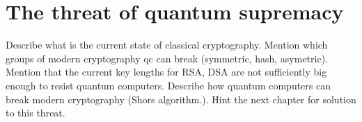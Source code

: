 \chapter{The threat of quantum supremacy}

Describe what is the current state of classical cryptography. Mention which groups of modern cryptography qc can break (symmetric, hash, asymetric). Mention that the current key lengths for RSA, DSA are not sufficiently big enough to resist quantum computers. Describe how quantum computers can break modern cryptography (Shors algorithm.). Hint the next chapter for solution to this threat.
